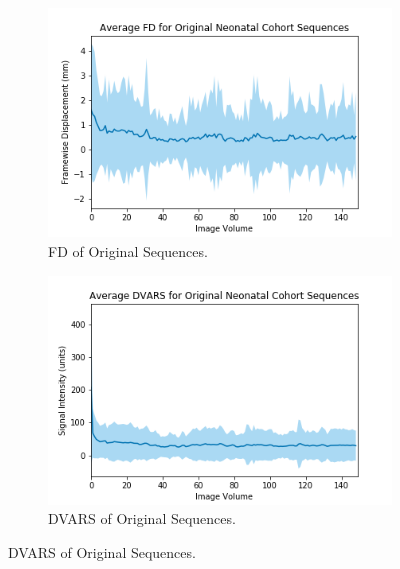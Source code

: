 \begin{figure}[t]
	\centering
	\begin{subfigure}{0.4\textwidth}
		\centering
		\includegraphics[width=1.0\textwidth]{6/figures/neonates-bold-fd-150.png}
		\caption{FD of Original Sequences.}
	\end{subfigure}
	\hspace{0.05\textwidth}
	\begin{subfigure}{0.4\textwidth}
		\centering
		\includegraphics[width=1.0\textwidth]{6/figures/neonates-bold-dvars-150.png}
		\caption{DVARS of Original Sequences.}
	\end{subfigure}
	

\end{figure}
